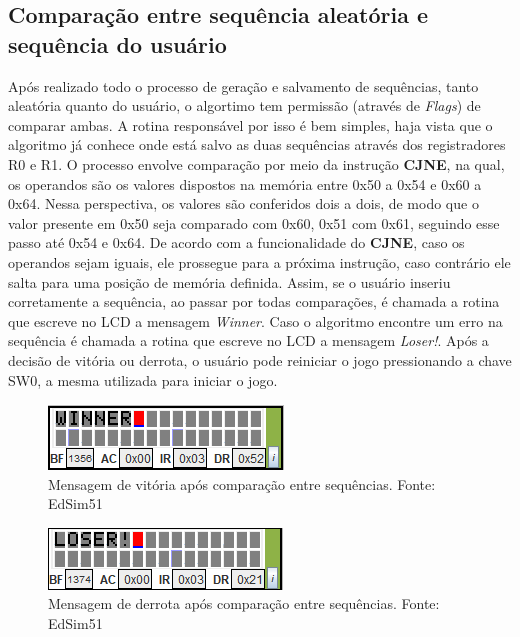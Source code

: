 \documentclass{article}
\begin{document}
\subsection{Comparação entre sequência aleatória e sequência do usuário}
Após realizado todo o processo de geração e salvamento de sequências, tanto aleatória quanto do usuário, o algortimo tem permissão (através de \textit{Flags}) de comparar ambas.\newline
A rotina responsável por isso é bem simples, haja vista que o algoritmo já conhece onde está salvo as duas sequências através dos registradores R0 e R1. O processo envolve comparação por meio da instrução \textbf{CJNE}, na qual, os operandos são os valores dispostos na memória entre 0x50 a 0x54 e 0x60 a 0x64. Nessa perspectiva, os valores são conferidos dois a dois, de modo que o valor presente em 0x50 seja comparado com 0x60, 0x51 com 0x61, seguindo esse passo até 0x54 e 0x64.\newline
De acordo com a funcionalidade do \textbf{CJNE}, caso os operandos sejam iguais, ele prossegue para a próxima instrução, caso contrário ele salta para uma posição de memória definida.\newline
Assim, se o usuário inseriu corretamente a sequência, ao passar por todas comparações, é chamada a rotina que escreve no LCD a mensagem \textit{Winner}. Caso o algoritmo encontre um erro na sequência é chamada a rotina que escreve no LCD a mensagem \textit{Loser!}.
Após a decisão de vitória ou derrota, o usuário pode reiniciar o jogo pressionando a chave SW0, a mesma utilizada para iniciar o jogo.
\begin{figure}[H]
\centering
\includegraphics[scale=1]{winner.PNG}
\caption{Mensagem de vitória após comparação entre sequências. Fonte: EdSim51}
\end{figure}
\begin{figure}[H]
\centering
\includegraphics[scale=1]{loser.png}
\caption{Mensagem de derrota após comparação entre sequências. Fonte: EdSim51}
\end{figure}
\newpage
\end{document}
